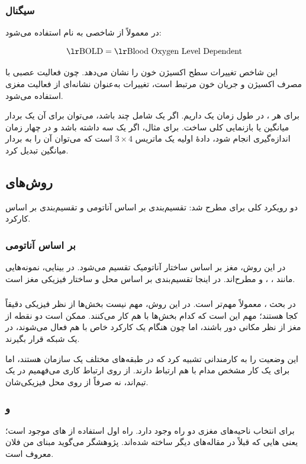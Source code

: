 \subsubsection{سیگنال }
در  معمولاً از شاخصی به نام  استفاده می‌شود:

\[
\text{\eng{BOLD}} = \text{\eng{Blood Oxygen Level Dependent}}
\]

این شاخص تغییرات سطح اکسیژن خون را نشان می‌دهد. چون فعالیت عصبی با مصرف اکسیژن و جریان خون مرتبط است، تغییرات  به‌عنوان نشانه‌ای از فعالیت مغزی استفاده می‌شود.

برای هر ، در طول زمان یک  داریم. اگر یک  شامل چند  باشد، می‌توان برای آن  یک بردار میانگین یا بازنمایی کلی ساخت. برای مثال، اگر یک  سه  داشته باشد و در چهار زمان اندازه‌گیری انجام شود، دادهٔ اولیه یک ماتریس \(3 \times 4\) است که می‌توان آن را به بردار میانگین  تبدیل کرد.

\subsection{روش‌های }
دو رویکرد کلی برای  مطرح شد: تقسیم‌بندی بر اساس آناتومی و تقسیم‌بندی بر اساس کارکرد.

\subsubsection{بر اساس آناتومی}
در این روش، مغز بر اساس ساختار آناتومیک تقسیم می‌شود. در بینایی، نمونه‌هایی مانند ، ،  و  مطرح‌اند. در اینجا تقسیم‌بندی بر اساس محل و ساختار فیزیکی مغز است.

\subsubsection{}
در بحث ،  معمولاً مهم‌تر است. در این روش، مهم نیست بخش‌ها از نظر فیزیکی دقیقاً کجا هستند؛ مهم این است که کدام بخش‌ها با هم کار می‌کنند. ممکن است دو نقطه از مغز از نظر مکانی دور باشند، اما چون هنگام یک کارکرد خاص با هم فعال می‌شوند، در یک شبکه قرار بگیرند.

این وضعیت را به کارمندانی تشبیه کرد که در طبقه‌های مختلف یک سازمان هستند، اما برای یک کار مشخص مدام با هم ارتباط دارند. از روی ارتباط کاری می‌فهمیم در یک تیم‌اند، نه صرفاً از روی محل فیزیکی‌شان.

\subsubsection{ و }
برای انتخاب ناحیه‌های مغزی دو راه وجود دارد. راه اول استفاده از های موجود است؛ یعنی هایی که قبلاً در مقاله‌های دیگر ساخته شده‌اند. پژوهشگر می‌گوید مبنای من فلان  معروف است.

